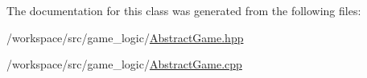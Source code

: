 The documentation for this class was generated from the following files\+:\begin{DoxyCompactItemize}
\item 
/workspace/src/game\+\_\+logic/\hyperlink{_abstract_game_8hpp}{Abstract\+Game.\+hpp}\item 
/workspace/src/game\+\_\+logic/\hyperlink{_abstract_game_8cpp}{Abstract\+Game.\+cpp}\end{DoxyCompactItemize}
